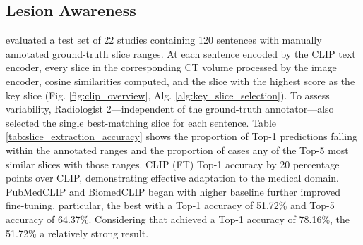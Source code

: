 \documentclass[bioengineering,article,submit,pdftex,moreauthors]{Definitions/mdpi}
\begin{document}
\subsection{Lesion Awareness}\label{sec:lesion_aware}
 evaluated  a test set of 22 studies containing 120 sentences with manually annotated ground-truth slice ranges. 
At  each sentence  encoded by the CLIP text encoder, every slice in the corresponding CT volume  processed by the image encoder, cosine similarities  computed, and the slice with the highest score   as the  key slice (Fig. \ref{fig:clip_overview}, Alg. \ref{alg:key_slice_selection}). 
To assess  variability, Radiologist 2—independent of the ground-truth annotator—also selected the single best-matching slice for each sentence.
Table \ref{tab:slice_extraction_accuracy} shows the proportion of Top-1 predictions falling within the annotated ranges and the proportion of cases  any of the Top-5 most similar slices  with those ranges. 
CLIP (FT)  Top-1 accuracy by 20 percentage points over CLIP, demonstrating effective adaptation to the medical domain.
PubMedCLIP and BiomedCLIP began with higher baseline   further improved  fine-tuning. 
 particular,  the best  with a Top-1 accuracy of 51.72\% and Top-5 accuracy of 64.37\%. 
Considering that   achieved a Top-1 accuracy of 78.16\%, the  51.72\%  a relatively strong result.
\end{document}
